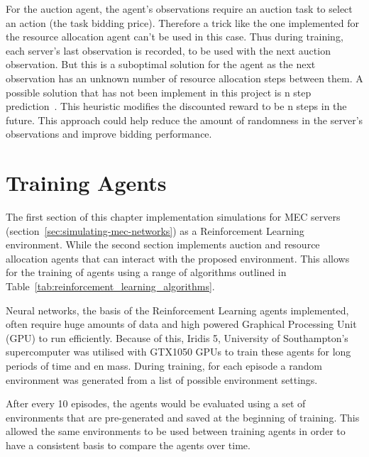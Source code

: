 For the auction agent, the agent's observations require an auction task to select an action (the task bidding price).
Therefore a trick like the one implemented for the resource allocation agent can't be used in this case. Thus during
training, each server's last observation is recorded, to be used with the next auction observation. But this is a
suboptimal solution for the agent as the next observation has an unknown number of resource allocation steps between
them. A possible solution that has not been implement in this project is n step prediction~\citep{multi-step-dqn}.
This heuristic modifies the discounted reward to be n steps in the future. This approach could help
reduce the amount of randomness in the server's observations and improve bidding performance.

\section{Training Agents}
\label{sec:training-agents}
The first section of this chapter implementation simulations for MEC servers
(section~\ref{sec:simulating-mec-networks}) as a Reinforcement Learning environment. While the second
section implements auction and resource allocation agents that can interact with the proposed environment. This allows
for the training of agents using a range of algorithms outlined in Table~\ref{tab:reinforcement_learning_algorithms}.

Neural networks, the basis of the Reinforcement Learning agents implemented, often require huge amounts of data and
high powered Graphical Processing Unit (GPU) to run efficiently. Because of this, Iridis 5, University of Southampton's
supercomputer was utilised with GTX1050 GPUs to train these agents for long periods of time and en mass. During training,
for each episode a random environment was generated from a list of possible environment settings.

After every 10 episodes, the agents would be evaluated using a set of environments that are pre-generated and
saved at the beginning of training. This allowed the same environments to be used between training agents in order to
have a consistent basis to compare the agents over time.

